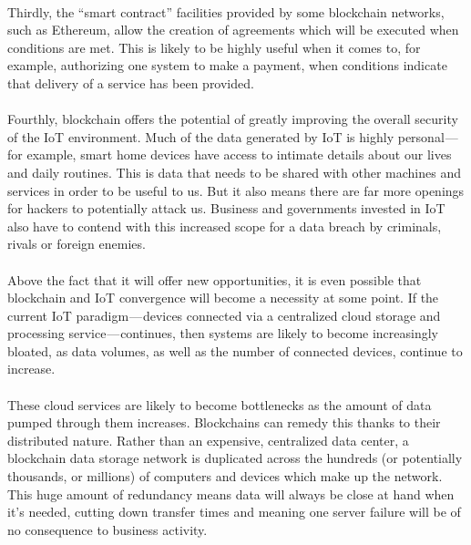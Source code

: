 \paragraph{}Thirdly, the “smart contract” facilities provided by some blockchain networks, such as Ethereum, allow the creation of agreements which will be executed when conditions are met. This is likely to be highly useful when it comes to, for example, authorizing one system to make a payment, when conditions indicate that delivery of a service has been provided.

\paragraph{}Fourthly, blockchain offers the potential of greatly improving the overall security of the IoT environment. Much of the data generated by IoT is highly personal — for example, smart home devices have access to intimate details about our lives and daily routines. This is data that needs to be shared with other machines and services in order to be useful to us. But it also means there are far more openings for hackers to potentially attack us. Business and governments invested in IoT also have to contend with this increased scope for a data breach by criminals, rivals or foreign enemies.

\paragraph{}Above the fact that it will offer new opportunities, it is even possible that blockchain and IoT convergence will become a necessity at some point. If the current IoT paradigm — devices connected via a centralized cloud storage and processing service — continues, then systems are likely to become increasingly bloated, as data volumes, as well as the number of connected devices, continue to increase.

\paragraph{}These cloud services are likely to become bottlenecks as the amount of data pumped through them increases. Blockchains can remedy this thanks to their distributed nature. Rather than an expensive, centralized data center, a blockchain data storage network is duplicated across the hundreds (or potentially thousands, or millions) of computers and devices which make up the network. This huge amount of redundancy means data will always be close at hand when it’s needed, cutting down transfer times and meaning one server failure will be of no consequence to business activity.

